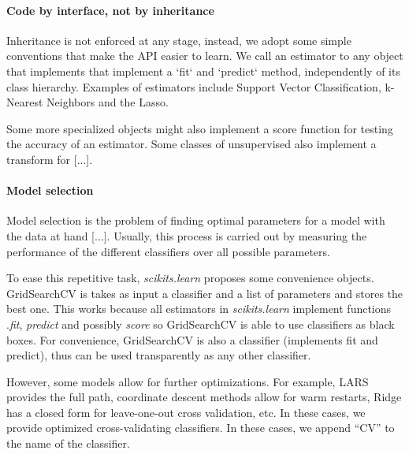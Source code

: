 \documentclass[twoside,11pt]{article}
\begin{document}
\paragraph{Code by interface, not by inheritance}

Inheritance is not enforced at any stage, instead, we adopt some
simple conventions that make the API easier to learn. We call an
estimator to any object that implements that implement a `fit` and
`predict` method, independently of its class hierarchy. Examples of
estimators include Support Vector Classification, k-Nearest Neighbors
and the Lasso.

Some more specialized objects might also implement a score function
for testing the accuracy of an estimator. Some classes of unsupervised
also implement a transform for [...].




\paragraph {Model selection}

Model selection is the problem of finding optimal parameters for a
model with the data at hand [...]. Usually, this process is carried
out by measuring the performance of the different classifiers over all
possible parameters.

To ease this repetitive task, \emph{scikits.learn} proposes some convenience
objects. GridSearchCV is takes as input a classifier and a list of
parameters and stores the best one. This works because all estimators
in \emph{scikits.learn} implement functions .\emph{fit}, \emph{predict} and
possibly \emph{score} so GridSearchCV is able to use classifiers as
black boxes. For convenience, GridSearchCV is also a classifier
(implements fit and predict), thus can be used transparently as any
other classifier.

However, some models allow for further optimizations. For example,
LARS provides the full path, coordinate descent methods allow for warm
restarts, Ridge has a closed form for leave-one-out cross validation,
etc. In these cases, we provide optimized cross-validating
classifiers. In these cases, we append ``CV'' to the name of the
classifier.
\end{document}
